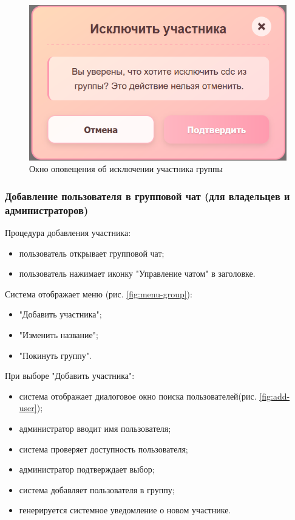 \begin{figure}[h]
	\centering
	\includegraphics[width=0.8\linewidth]{"images/Окно уточнения исключения"}
	\caption{Окно оповещения об исключении участника группы}
	\label{fig:get-out-menu}
\end{figure}

\subsubsection{Добавление пользователя в групповой чат (для владельцев и администраторов)}
Процедура добавления участника:
\begin{itemize}
	\item пользователь открывает групповой чат;
	\item пользователь нажимает иконку "Управление чатом" в заголовке.
\end{itemize}

Система отображает меню (рис. \ref{fig:menu-group}):
\begin{itemize}
	\item "Добавить участника";
	\item "Изменить название";
	\item "Покинуть группу".
\end{itemize}

При выборе "Добавить участника":
\begin{itemize}
	\item система отображает диалоговое окно поиска пользователей(рис. \ref{fig:add-user});
	\item администратор вводит имя пользователя;
	\item система проверяет доступность пользователя;
	\item администратор подтверждает выбор;
	\item система добавляет пользователя в группу;
	\item генерируется системное уведомление о новом участнике.
\end{itemize}

